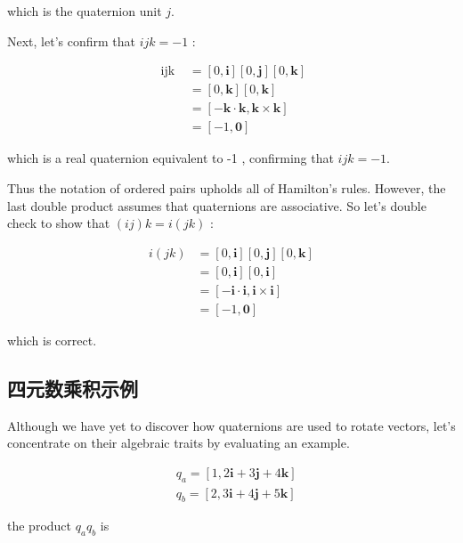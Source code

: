 which is the quaternion unit $j$.

Next, let's confirm that $i j k=-1$ :

$$
    \begin{aligned}
        \text { ijk } & =[0, \mathbf{i}][0, \mathbf{j}][0, \mathbf{k}]                \\
                      & =[0, \mathbf{k}][0, \mathbf{k}]                               \\
                      & =[-\mathbf{k} \cdot \mathbf{k}, \mathbf{k} \times \mathbf{k}] \\
                      & =[-1, \mathbf{0}]
    \end{aligned}
$$

which is a real quaternion equivalent to -1 , confirming that $i j k=-1$.

Thus the notation of ordered pairs upholds all of Hamilton's rules. However, the last double product assumes that quaternions are associative. So let's double check to show that $(i j) k=i(j k)$ :

$$
    \begin{aligned}
        i(j k) & =[0, \mathbf{i}][0, \mathbf{j}][0, \mathbf{k}]                \\
               & =[0, \mathbf{i}][0, \mathbf{i}]                               \\
               & =[-\mathbf{i} \cdot \mathbf{i}, \mathbf{i} \times \mathbf{i}] \\
               & =[-1, \mathbf{0}]
    \end{aligned}
$$

which is correct.

\subsection{四元数乘积示例}
Although we have yet to discover how quaternions are used to rotate vectors, let's concentrate on their algebraic traits by evaluating an example.

$$
    \begin{aligned}
         & q_{a}=[1,2 \mathbf{i}+3 \mathbf{j}+4 \mathbf{k}] \\
         & q_{b}=[2,3 \mathbf{i}+4 \mathbf{j}+5 \mathbf{k}]
    \end{aligned}
$$

the product $q_{a} q_{b}$ is

